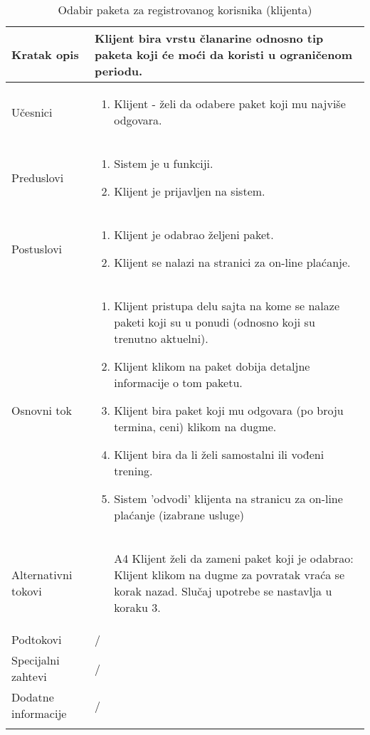 \documentclass[../main.tex]{subfiles}
\begin{document}
\begin{longtable}{| p{} | p{} |} 

\hline
    Kratak opis & Klijent bira vrstu članarine odnosno tip paketa koji će moći da koristi u ograničenom periodu. \\ 
\hline    
    Učesnici & 
    	\begin{enumerate}
        \item Klijent - želi da odabere paket koji mu najviše odgovara.
     \end{enumerate}\\
\hline
   Preduslovi & \begin{enumerate}
       \item Sistem je u funkciji.
       \item Klijent je prijavljen na sistem.
   \end{enumerate}\\
\hline  
    Postuslovi & \begin{enumerate}
        \item Klijent je odabrao željeni paket.
        \item Klijent se nalazi na stranici za on-line plaćanje.
    \end{enumerate}\\
\hline
    Osnovni tok & \begin{enumerate}
        \item Klijent pristupa delu sajta na kome se nalaze paketi koji su u ponudi (odnosno koji su trenutno aktuelni).
        \item Klijent klikom na paket dobija detaljne informacije o tom paketu.
        \item Klijent bira paket koji mu odgovara (po broju termina, ceni) klikom na dugme.
        \item Klijent bira da li želi samostalni ili vođeni trening.
        \item Sistem 'odvodi' klijenta na stranicu za on-line plaćanje (izabrane usluge)
    \end{enumerate}\\
\hline
    Alternativni tokovi & \begin{itemize}
        \item[A4]  Klijent želi da zameni paket koji je odabrao: Klijent klikom na dugme za povratak vraća se korak nazad. Slučaj upotrebe se nastavlja u koraku 3.

    \end{itemize}\\
\hline
    Podtokovi & /\\
\hline
    Specijalni zahtevi & /\\
\hline
    Dodatne informacije & /\\
\hline
\caption{Odabir paketa za registrovanog korisnika (klijenta)} %
\end{longtable}
\end{document}

